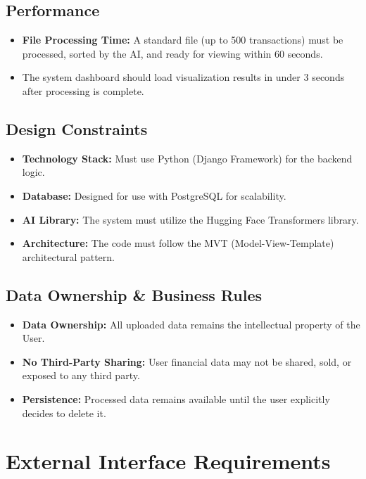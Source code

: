 \documentclass[11pt,a4paper]{report}
\begin{document}
\subsection{Performance}
\begin{itemize}
	\item \textbf{File Processing Time:} A standard file (up to 500 transactions) must be processed, sorted by the AI, and ready for viewing within 60 seconds.
	\item The system dashboard should load visualization results in under 3 seconds after processing is complete.
\end{itemize}

\subsection{Design Constraints}
\begin{itemize}
	\item \textbf{Technology Stack:} Must use Python (Django Framework) for the backend logic.
	\item \textbf{Database:} Designed for use with PostgreSQL for scalability.
	\item \textbf{AI Library:} The system must utilize the Hugging Face Transformers library.
	\item \textbf{Architecture:} The code must follow the MVT (Model-View-Template) architectural pattern.
\end{itemize}

\subsection{Data Ownership \& Business Rules}
\begin{itemize}
	\item \textbf{Data Ownership:} All uploaded data remains the intellectual property of the User.
	\item \textbf{No Third-Party Sharing:} User financial data may not be shared, sold, or exposed to any third party.
	\item \textbf{Persistence:} Processed data remains available until the user explicitly decides to delete it.
\end{itemize}

\section{External Interface Requirements}
\end{document}
